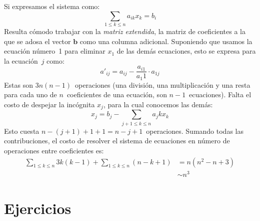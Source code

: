   Si expresamos el sistema como:
  \begin{equation*}
    \sum_{1 \le k \le n} a_{i k} x_k
      = b_i
  \end{equation*}
  Resulta cómodo trabajar con la \emph{matriz extendida},
  la matriz de coeficientes a la que se adosa el vector \(\mathbf{b}\)
  como una columna adicional.
  Suponiendo que usamos la ecuación número~\num{1}
  para eliminar \(x_1\) de las demás ecuaciones,
  esto se expresa para la ecuación~\(j\) como:
  \begin{equation*}
    a'_{i j}
      = a_{i j} - \frac{a_{i 1}}{a_1 1} \cdot a_{1 j}
  \end{equation*}
  Estas son \(3 n (n - 1)\)~operaciones
  (una división, una multiplicación y una resta
   para cada uno de \(n\)~coeficientes de una ecuación,
   son \(n - 1\)~ecuaciones).
  Falta el costo de despejar la incógnita \(x_j\),
  para la cual conocemos las demás:
  \begin{equation*}
    x_j
      = b_j - \sum_{j + 1 \le k \le n} a_j k x_k
  \end{equation*}
  Esto cuesta \(n - (j + 1) + 1 + 1 = n - j + 1\)~operaciones.
  Sumando todas las contribuciones,
  el costo de resolver el sistema de ecuaciones
  en número de operaciones entre coeficientes es:
  \begin{align*}
    \sum_{1 \le k \le n} 3 k (k - 1)
      + \sum_{1 \le k \le n} (n - k + 1)
      &=    n (n^2 - n + 3) \\
      &\sim n^3
  \end{align*}

\section*{Ejercicios}
\label{sec:ejercicios-07-post-previa}

